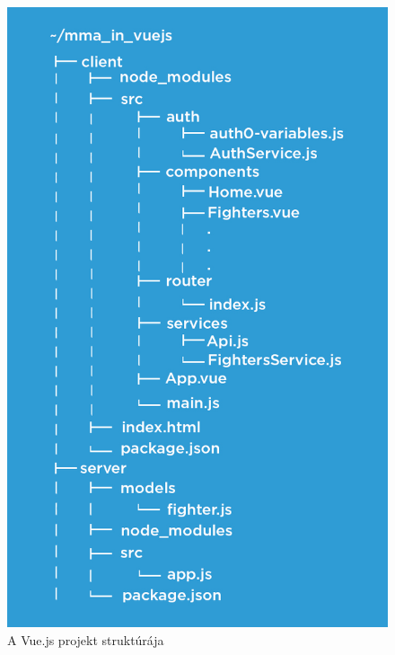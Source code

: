 \begin{figure}[htb]
\centering
\includegraphics[scale=0.4]{kepek/mma_in_vue.jpeg}
\caption{A Vue.js projekt struktúrája}
\label{fig:vue_structure}
\end{figure}
